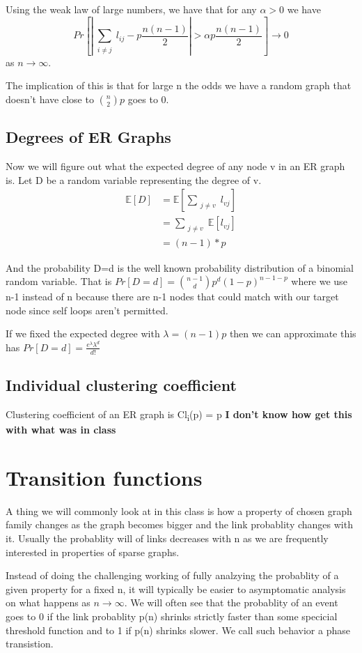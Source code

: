 \documentclass[11pt]{article}
\newcommand\ssum[1]{\sum_{\substack{#1}}}
\newcommand\E{\mathbb{E}}
\begin{document}
Using the weak law of large numbers, we have that for any \(\alpha > 0\) we have
$$Pr[\left| \ssum{i \neq j} l_{ij} - p \frac{n(n-1)}{2} \right|  > \alpha p \frac{n(n-1)}{2} ] \to 0$$
as \(n \to \infty\).

The implication of this is that for large n the odds we have a random graph that doesn't have close to \(\binom{n}{2}p\) goes to 0.

\subsection{Degrees of ER Graphs}
\label{sec:orgbbc69c2}
Now we will figure out what the expected degree of any node v in an ER graph is. Let D be a random variable representing the degree of v.
\begin{align}
\E[D] &= \E[\ssum{j\neq v} l_{{vj} }] \\
&= \ssum{j\neq v} \E [ l_{vj} ] \\
&= (n-1)*p
\end{align}

And the probability D=d is the well known probability distribution of a binomial random variable. That is \(Pr[D=d] = \binom{n-1}{d} p^{d} (1-p)^{n-1-p}\) where we use n-1 instead of n because there are n-1 nodes that could match with our target node since self loops aren't permitted.

If we fixed the expected degree with \(\lambda = (n-1)p\) then we can approximate this has \(Pr[D=d] = \frac{e^\lambda \lambda^{d}}{d!}\)



\subsection{Individual clustering coefficient}
\label{sec:orga5bfc09}
Clustering coefficient of an ER graph is Cl\textsubscript{i}(p) = p
\textbf{I don't know how get this with what was in class}

\section{Transition functions}
\label{sec:org1afbe23}
A thing we will commonly look at in this class is how a property of chosen graph family changes as the graph becomes bigger and the link probablity changes with it. Usually the probablity will of links decreases with n as we are frequently interested in properties of sparse graphs.

Instead of doing the challenging working of fully analzying the probablity of a given property for a fixed n, it will typically be easier to asymptomatic analysis on what happens as \(n\to \infty\). We will often see that the probablity of an event goes to 0 if the link probablity p(n) shrinks strictly faster than some specicial threshold function and to 1 if p(n) shrinks slower. We call such behavior a phase transistion.
\end{document}
